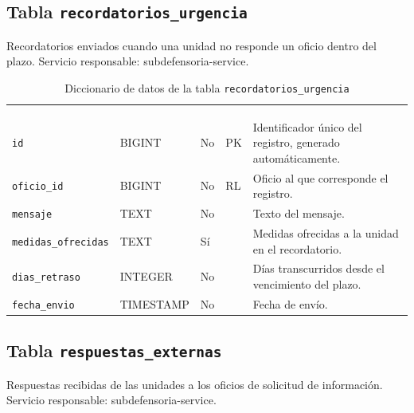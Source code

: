 \subsection{Tabla \texttt{recordatorios\_urgencia}}
Recordatorios enviados cuando una unidad no responde un oficio dentro del plazo. Servicio responsable: subdefensoria-service.


\footnotesize
\renewcommand{\arraystretch}{1.15}
\setlength{\tabcolsep}{4pt}
\begin{longtable}{|L{3.9cm}|L{2.4cm}|L{0.9cm}|L{1.2cm}|L{6.6cm}|}
	\hiderowcolors\caption{Diccionario de datos de la tabla \texttt{recordatorios\_urgencia}}
	\label{tab:dic_recordatorios_urgencia} \\ \showrowcolors
	\hline
	 &  &  &  &  \\
	\hline
	\endfirsthead
	\hline
	 &  &  &  &  \\
	\hline
	\endhead
		\texttt{id} & BIGINT & No & PK & Identificador único del registro, generado automáticamente. \\ \hline
		\texttt{oficio\_\allowbreak{}id} & BIGINT & No & RL & Oficio al que corresponde el registro. \\ \hline
		\texttt{mensaje} & TEXT & No &  & Texto del mensaje. \\ \hline
		\texttt{medidas\_\allowbreak{}ofrecidas} & TEXT & Sí &  & Medidas ofrecidas a la unidad en el recordatorio. \\ \hline
		\texttt{dias\_\allowbreak{}retraso} & INTEGER & No &  & Días transcurridos desde el vencimiento del plazo. \\ \hline
		\texttt{fecha\_\allowbreak{}envio} & TIMESTAMP & No &  & Fecha de envío. \\ \hline
\end{longtable}
\normalsize
\setlength{\tabcolsep}{6pt}
\renewcommand{\arraystretch}{1}

\subsection{Tabla \texttt{respuestas\_externas}}
Respuestas recibidas de las unidades a los oficios de solicitud de información. Servicio responsable: subdefensoria-service.


